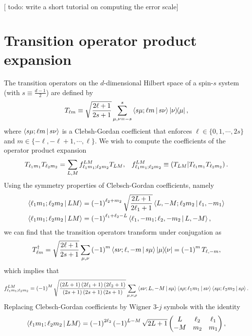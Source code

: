 \documentclass[notitlepage,twocolumn]{revtex4-2}
\newcommand{\f}[2]{\dfrac{#1}{#2}} %
\newcommand{\p}[1]{\left(#1\right)} %
\newcommand{\bk}{\Braket} %
\renewcommand{\set}[1]{\{#1\}} %
\def\obk#1{\mathinner{({#1})}}
\newcommand{\red}[1]{{\color{red} #1}}
\begin{document}
[\red{todo: write a short tutorial on computing the error scale}]

\section{Transition operator product expansion}
\label{sec:trans_prod}

The transition operators on the $d$-dimensional Hilbert space of a spin-$s$ system (with $s\equiv\frac{d-1}{2}$) are defined by
\begin{align}
  T_{\ell m} \equiv \sqrt{\f{2\ell+1}{2s+1}} \sum_{\mu,\nu=-s}^s
  \bk{s\mu;\ell m|s\nu} \op{\nu}{\mu},
\end{align}
where $\bk{s\mu;\ell m|s\nu}$ is a Clebsh-Gordan coefficient that enforces $\ell\in\set{0,1,\cdots,2s}$ and $m\in\set{-\ell,-\ell+1,\cdots,\ell}$.
We wish to compute the coefficients of the operator product expansion
\begin{align}
  T_{\ell_1 m_1} T_{\ell_2 m_2}
  = \sum_{L,M} f_{\ell_1 m_1;\ell_2 m_2}^{LM} T_{LM},
  &&
  f_{\ell_1 m_1;\ell_2 m_2}^{LM}
  \equiv \obk{T_{LM} | T_{\ell_1 m_1} T_{\ell_2 m_2}}.
\end{align}
Using the symmetry properties of Clebsch-Gordan coefficients, namely
\begin{align}
  \bk{\ell_1 m_1; \ell_2 m_2| L M}
  &= \p{-1}^{\ell_2+m_2} \sqrt{\f{2L+1}{2\ell_1+1}}
  \bk{L,-M; \ell_2 m_2| \ell_1,-m_1} \\
  \bk{\ell_1 m_1; \ell_2 m_2| L M}
  &= \p{-1}^{\ell_1+\ell_2-L}
  \bk{\ell_1,-m_1; \ell_2,-m_2| L,-M},
\end{align}
we can find that the transition operators transform under conjugation as
\begin{align}
  T_{\ell m}^\dag
  = \sqrt{\f{2\ell+1}{2s+1}}
  \sum_{\mu,\nu} \p{-1}^m \bk{s\nu;\ell,-m|s\mu} \op{\mu}{\nu}
  = \p{-1}^m T_{\ell,-m},
\end{align}
which implies that
\begin{align}
  f_{\ell_1 m_1;\ell_2 m_2}^{LM}
  = \p{-1}^M \sqrt{\f{\p{2L+1}\p{2\ell_1+1}\p{2\ell_2+1}}
    {\p{2s+1}\p{2s+1}\p{2s+1}}}
  \sum_{\mu,\nu,\rho} \bk{s\nu;L,-M|s\mu}
  \bk{s\rho;\ell_1m_1|s\nu} \bk{s\mu;\ell_2m_2|s\rho}.
\end{align}
Replacing Clebsch-Gordan coefficients by Wigner 3-$j$ symbols with the identity
\begin{align}
  \bk{\ell_1 m_1; \ell_2 m_2| L M}
  = \p{-1}^{2\ell_2} \p{-1}^{L-M} \sqrt{2L+1}
  \begin{pmatrix}
    L & \ell_2 & \ell_1 \\
    -M & m_2 & m_1
  \end{pmatrix},
\end{align}
\end{document}
